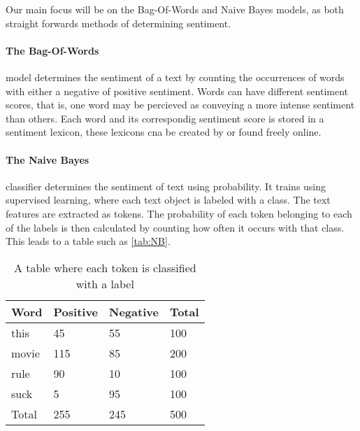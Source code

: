 
Our main focus will be on the Bag-Of-Words and Naive Bayes models, as both
straight forwards methods of determining sentiment.


\paragraph{The Bag-Of-Words} model determines the sentiment of a text by
counting the occurrences of words with either a negative of positive sentiment.
Words can have different sentiment scores, that is, one word may be percieved
as conveying a more intense sentiment than others. Each word and its
correspondig sentiment score is stored in a sentiment lexicon, these lexicons
cna be created by or found freely online\citep{BagOfWords}.

\paragraph{The Naive Bayes} classifier determines the sentiment of text using
probability. It trains using supervised learning, where each text object
is labeled with a class. The text features are extracted as tokens.
The probability of each token belonging to each of the labels is then
calculated by counting how often it occurs with that class. This leads to a
table such as \autoref{tab:NB}.

\begin{table}[H]
\centering
\begin{tabular}{|l|l|l|l|}
\hline
Word & Positive & Negative & Total 	\\ \hline
this & 45 & 55 & 100				\\ \hline
movie & 115 & 85 & 200				\\ \hline
rule & 90 & 10 & 100				\\ \hline
suck & 5 & 95 & 100					\\ \hline
Total & 255 & 245 & 500				\\ \hline
\end{tabular}
\caption{A table where each token is classified with a label}
\label{tab:NB}
\end{table}

